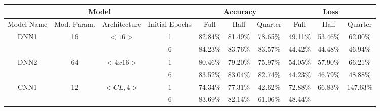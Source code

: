 \begin{landscape}
\begin{table}[htbp]
\begin{tabular}{|cccc|ccc|ccc|}
\hline
\multicolumn{4}{|c|}{Model} &
  \multicolumn{3}{c|}{Accuracy} &
  \multicolumn{3}{c|}{Loss} \\ \hline
\multicolumn{1}{|c|}{Model Name} &
  \multicolumn{1}{c|}{Mod. Param.} &
  \multicolumn{1}{c|}{Architecture} &
  Initial Epochs &
  \multicolumn{1}{c|}{Full} &
  \multicolumn{1}{c|}{Half} &
  Quarter &
  \multicolumn{1}{c|}{Full} &
  \multicolumn{1}{c|}{Half} &
  Quarter \\ \hline
\multicolumn{1}{|c|}{\multirow{2}{*}{DNN1}} &
  \multicolumn{1}{c|}{\multirow{2}{*}{16}} &
  \multicolumn{1}{c|}{\multirow{2}{*}{$<16>$}} &
  1 &
  \multicolumn{1}{c|}{82.84\%} &
  \multicolumn{1}{c|}{81.49\%} &
  78.65\% &
  \multicolumn{1}{c|}{49.11\%} &
  \multicolumn{1}{c|}{53.46\%} &
  62.00\% \\ \cline{4-10}
\multicolumn{1}{|c|}{} &
  \multicolumn{1}{c|}{} &
  \multicolumn{1}{c|}{} &
  6 &
  \multicolumn{1}{c|}{84.23\%} &
  \multicolumn{1}{c|}{83.76\%} &
  83.57\% &
  \multicolumn{1}{c|}{44.42\%} &
  \multicolumn{1}{c|}{44.48\%} &
  46.94\% \\ \hline
\multicolumn{1}{|c|}{\multirow{2}{*}{DNN2}} &
  \multicolumn{1}{c|}{\multirow{2}{*}{64}} &
  \multicolumn{1}{c|}{\multirow{2}{*}{$<4x16>$}} &
  1 &
  \multicolumn{1}{c|}{80.46\%} &
  \multicolumn{1}{c|}{79.20\%} &
  75.97\% &
  \multicolumn{1}{c|}{54.05\%} &
  \multicolumn{1}{c|}{57.90\%} &
  66.21\% \\ \cline{4-10}
\multicolumn{1}{|c|}{} &
  \multicolumn{1}{c|}{} &
  \multicolumn{1}{c|}{} &
  6 &
  \multicolumn{1}{c|}{83.52\%} &
  \multicolumn{1}{c|}{83.04\%} &
  82.74\% &
  \multicolumn{1}{c|}{44.23\%} &
  \multicolumn{1}{c|}{46.79\%} &
  48.88\% \\ \hline
\multicolumn{1}{|c|}{\multirow{2}{*}{CNN1}} &
  \multicolumn{1}{c|}{\multirow{2}{*}{12}} &
  \multicolumn{1}{c|}{\multirow{2}{*}{$<CL,4>$}} &
  1 &
  \multicolumn{1}{c|}{74.34\%} &
  \multicolumn{1}{c|}{77.31\%} &
  42.62\% &
  \multicolumn{1}{c|}{72.88\%} &
  \multicolumn{1}{c|}{66.83\%} &
  147.63\% \\ \cline{4-10}
\multicolumn{1}{|c|}{} &
  \multicolumn{1}{c|}{} &
  \multicolumn{1}{c|}{} &
  6 &
  \multicolumn{1}{c|}{83.69\%} &
  \multicolumn{1}{c|}{82.14\%} &
  61.06\% &
  \multicolumn{1}{c|}{48.44\%} &

\end{tabular}
\end{table}
\end{landscape}
